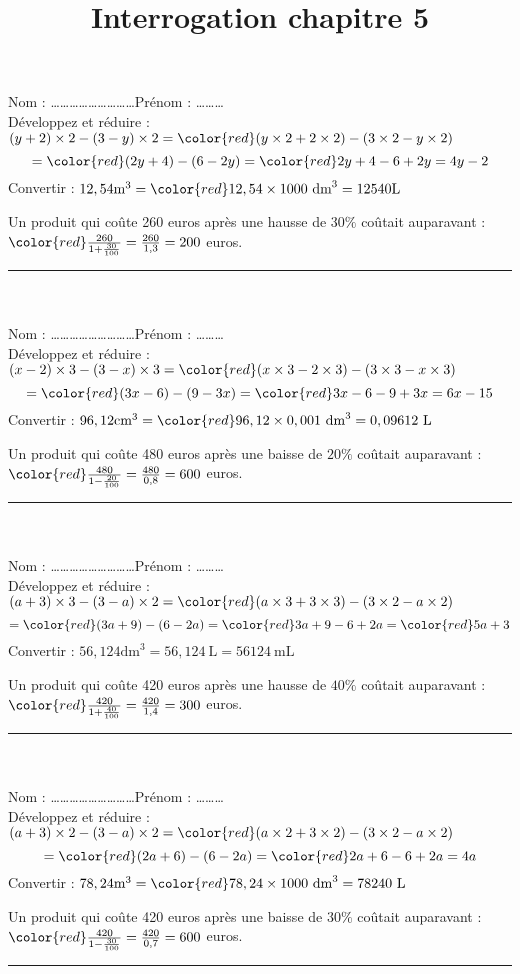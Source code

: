 \documentclass[14 pt, fleqn]{extarticle}
\title{Interrogation chapitre 5}
\date{}
\theoremstyle{plain}
\begin{document}
	

\baselineskip


 Nom : \ldots\ldots\ldots\ldots\ldots\ldots\ldots\ldots\ldots Prénom : \ldots\ldots\ldots \\ 
Développez et réduire :
 \( (y+2)\times 2 - (3 - y) \times 2 ={\color{red}   
 (y \times 2 + 2 \times 2) - ( 3 \times 2 - y \times 2)
 } \)
 \[ = {\color{red}   
 (2y + 4) - (6 - 2y)
 }
 =
 {\color{red}   
 2y + 4 - 6 + 2y = 4y - 2
 }\]
 Convertir : 
 \( 12,54 \text{m}^3 = 
 {\color{red}   12, 54 \times 1 000\ \text{dm}^3 = 12 540 } \text{L}\)
 
Un produit qui coûte 260 euros après une hausse de $30\%$ coûtait auparavant : $ {\color{red} \frac{260}{1+\frac{30}{100}} = \frac{260}{1,3}= 200
 }$ euros.
 \ \\  
 \hrule
 \ \\ \ \\
 Nom : \ldots\ldots\ldots\ldots\ldots\ldots\ldots\ldots\ldots Prénom : \ldots\ldots\ldots \\ 
Développez et réduire :
\((x-2)\times 3 - (3 - x) \times 3 =
 {\color{red} (x \times 3 - 2 \times 3) - ( 3\times 3 - x \times 3)} \)
 \[ =  {\color{red}(3x - 6) - (9 - 3x)  }= 
  {\color{red} 3x - 6 - 9 + 3x = 6x - 15}
 \]
 Convertir : 
 \( 96,12\text{cm}^3 =  {\color{red} 96, 12 \times 0,001\ \text{dm}^3= 0,09612}\ \text{L}\)
 
Un produit qui coûte 480 euros après une baisse de $20\%$ coûtait auparavant  :$ {\color{red} \frac{480}{1-\frac{20}{100}}= \frac{480}{0,8}= 600}$ euros.
 \ \\  
 
 \hrule
 \ \\ \ \\
 Nom : \ldots\ldots\ldots\ldots\ldots\ldots\ldots\ldots\ldots Prénom : \ldots\ldots\ldots \\ 
Développez et réduire :
 \( (a+3)\times 3 - (3- a) \times 2  = {\color{red} (a\times 3 + 3 \times 3) - (3\times 2 - a \times2)} \)
 \[ = 
  {\color{red} (3a + 9)-(6 - 2a)}=  
  {\color{red} 3a + 9 - 6 + 2a} = 
   {\color{red} 5a + 3}\]
 Convertir : 
 \( 56,124 \text{dm}^3 = 56, 124\ \text{L} = 56 124 \  \text{mL}\)
 
Un produit qui coûte 420 euros après une hausse de $40\%$ coûtait auparavant : ${\color{red}\frac{420}{1+\frac{40}{100}} = \frac{420}{1,4} = 300} $ euros.
 \ \\ 
 \hrule
 \ \\ \ \\
 Nom : \ldots\ldots\ldots\ldots\ldots\ldots\ldots\ldots\ldots Prénom : \ldots\ldots\ldots \\ 
Développez et réduire :
 \( (a+3)\times 2 - (3 - a) \times 2  =
  {\color{red} (a\times 2 + 3\times 2) - (3\times 2- a \times 2)} \)
 \[ =  {\color{red} (2a+6) - (6-2a) } =
  {\color{red} 2a + 6 - 6 + 2a = 4a}\]
 Convertir : 
 \( 78,24 \text{m}^3 =  {\color{red} 78, 24\times 1 000\ \text{dm}^3 = 78 240}\ \text{L}\)
 
Un produit qui coûte 420 euros après une baisse de $30\%$ coûtait auparavant  :${\color{red}\frac{420}{1-\frac{30}{100}} = \frac{420}{0,7} = 600} $ euros.
 \hrule
 
 
 
 	
\end{document}
